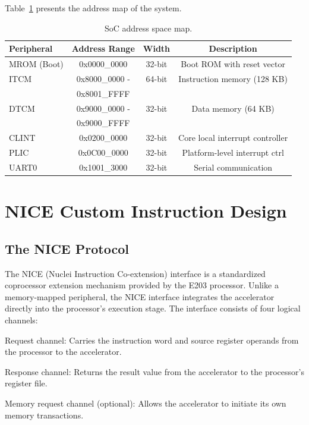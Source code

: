 Table~\ref{tab:3_1} presents the address map of the system.

\begin{table}[htbp]
\centering
\caption{SoC address space map.}
\label{tab:3_1}
\begin{tabular}{lccc}
\hline
Peripheral & Address Range & Width & Description \\ \hline\hline
MROM (Boot) & 0x0000\_0000 & 32-bit & Boot ROM with reset vector \\ \hline
ITCM & 0x8000\_0000 - & 64-bit & Instruction memory (128 KB) \\ \hline
 & 0x8001\_FFFF &  &  \\ \hline
DTCM & 0x9000\_0000 - & 32-bit & Data memory (64 KB) \\ \hline
 & 0x9000\_FFFF &  &  \\ \hline
CLINT & 0x0200\_0000 & 32-bit & Core local interrupt controller \\ \hline
PLIC & 0x0C00\_0000 & 32-bit & Platform-level interrupt ctrl \\ \hline
UART0 & 0x1001\_3000 & 32-bit & Serial communication \\ \hline
\end{tabular}
\end{table}

\section{NICE Custom Instruction Design}\label{sec:3_2}

\subsection{The NICE Protocol}

The NICE (Nuclei Instruction Co-extension) interface is a standardized coprocessor extension mechanism provided by the E203 processor. Unlike a memory-mapped peripheral, the NICE interface integrates the accelerator directly into the processor’s execution stage. The interface consists of four logical channels:

Request channel: Carries the instruction word and source register operands from the processor to the accelerator.

Response channel: Returns the result value from the accelerator to the processor’s register file.

Memory request channel (optional): Allows the accelerator to initiate its own memory transactions.

